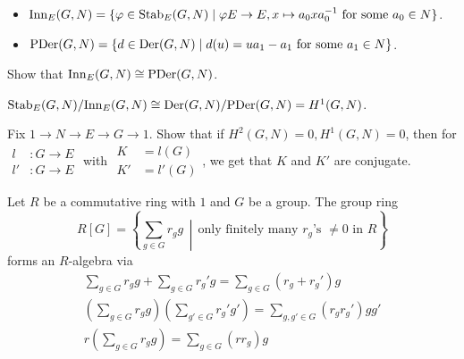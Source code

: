 \begin{definition} \mbox{}
  \begin{itemize}
    \item $\operatorname{Inn}_E(G, N) = \{ \varphi \in \operatorname{Stab}_E(G, N) \mid
      \varphi E \to E, x \mapsto a_0 x a_0^{-1} \text{~for some~} a_0 \in N \}$.
    \item $\operatorname{PDer}(G, N) = \{ d \in \operatorname{Der}(G, N) \mid
      d(u) = ua_1 - a_1 \text{~for some~} a_1 \in N \}$.
  \end{itemize}
\end{definition}

\begin{exercise}
  Show that $\operatorname{Inn}_E(G, N) \cong \operatorname{PDer}(G, N)$.
\end{exercise}

${\operatorname{Stab}_E(G, N)}/{\operatorname{Inn}_E(G, N)} \cong {\operatorname{Der}(G, N)}/{\operatorname{PDer}(G, N)}
= H^1(G, N)$.

\begin{exercise}
  Fix $1\to N\to E\to G\to 1$. Show that if
  $H^2(G, N) = 0, H^1(G, N) = 0$, then for $\begin{aligned}
    l&:G\to E\\
    l'&:G\to E
  \end{aligned}$ with $\begin{aligned}
    K &= l(G) \\
    K' &= l'(G)
  \end{aligned}$, we get that $K$ and $K'$ are conjugate.
\end{exercise}

\begin{definition}
  Let $R$ be a commutative ring with $1$ and $G$ be a group.
  The group ring 
  \[ R[G] = \left\{ \sum_{g\in G} r_g g \,\middle|\,
    \text{only finitely many $r_g$'s $\ne 0$ in $R$}
  \right\} \]
  forms an $R$-algebra via
  \begin{gather*}
    \sum_{g\in G} r_g g + \sum_{g\in G} r_g' g
    = \sum_{g\in G} (r_g + r_g') g \\
    \left(\sum_{g\in G} r_g g\right)\left( \sum_{g'\in G} r_g' g' \right)
    = \sum_{g, g'\in G} (r_g r_g') g g' \\
    r\left(\sum_{g\in G} r_g g\right) = \sum_{g\in G} (rr_g) g
  \end{gather*}
\end{definition}


